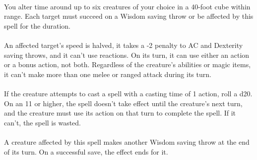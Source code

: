 \documentclass[a5paper,12pt]{article}
\begin{document}
\paragraph{}
You alter time around up to six creatures of your choice in a 40-foot cube within range. Each target must succeed on a Wisdom saving throw or be affected by this spell for the duration.

\paragraph{}
An affected target's speed is halved, it takes a -2 penalty to AC and Dexterity saving throws, and it can't use reactions. On its turn, it can use either an action or a bonus action, not both. Regardless of the creature's abilities or magic items, it can't make more than one melee or ranged attack during its turn.

\paragraph{}
If the creature attempts to cast a spell with a casting time of 1 action, roll a d20. On an 11 or higher, the spell doesn't take effect until the creature's next turn, and the creature must use its action on that turn to complete the spell. If it can't, the spell is wasted.

\paragraph{}
A creature affected by this spell makes another Wisdom saving throw at the end of its turn. On a successful save, the effect ends for it.
\end{document}
